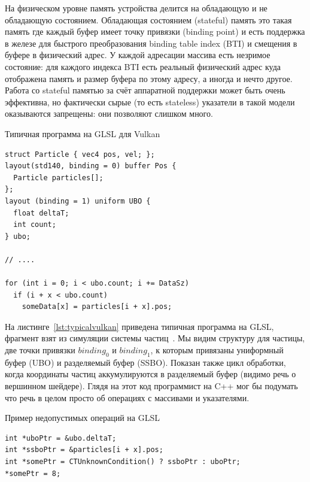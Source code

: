 На физическом уровне память устройства делится на обладающую и не обладающую состоянием. Обладающая состоянием (stateful) память это такая память где каждый буфер имеет точку привязки (binding point) и есть поддержка в железе для быстрого преобразования binding table index (BTI) и смещения в буфере в физический адрес. У каждой адресации массива есть незримое состояние: для каждого индекса BTI есть реальный физический адрес куда отображена память и размер буфера по этому адресу, а иногда и нечто другое. Работа со stateful памятью за счёт аппаратной поддержки может быть очень эффективна, но фактически сырые (то есть stateless) указатели в такой модели оказываются запрещены: они позволяют слишком много.

\begin{ListingEnv}[!h]
    \captiondelim{ } 
    \caption{Типичная программа на GLSL для Vulkan}\label{lst:typicalvulkan}
    \begin{lstlisting}[language={[ISO]C++}]
struct Particle { vec4 pos, vel; };
layout(std140, binding = 0) buffer Pos {
  Particle particles[];
};
layout (binding = 1) uniform UBO {
  float deltaT;
  int count;
} ubo;

// ....

for (int i = 0; i < ubo.count; i += DataSz)
  if (i + x < ubo.count)
    someData[x] = particles[i + x].pos;
    \end{lstlisting}
\end{ListingEnv}

На листинге~\cref{lst:typicalvulkan} приведена типичная программа на GLSL, фрагмент взят из симуляции системы частиц~\cite{gunadi2018real}. Мы видим структуру для частицы, две точки привязки $binding_0$ и $binding_1$, к которым привязаны униформный буфер (UBO) и разделяемый буфер (SSBO). Показан также цикл обработки, когда координаты частиц аккумулируются в разделяемый буфер (видимо речь о вершинном шейдере). Глядя на этот код программист на C++ мог бы подумать что речь в целом просто об операциях с массивами и указателями.


\begin{ListingEnv}[!h]
  \captiondelim{ } 
  \caption{Пример недопустимых операций на GLSL}\label{lst:fakepointers}
  \begin{lstlisting}[language={[ISO]C++}]
int *uboPtr = &ubo.deltaT;
int *ssboPtr = &particles[i + x].pos;
int *somePtr = CTUnknownCondition() ? ssboPtr : uboPtr;
*somePtr = 8;
  \end{lstlisting}
\end{ListingEnv}

